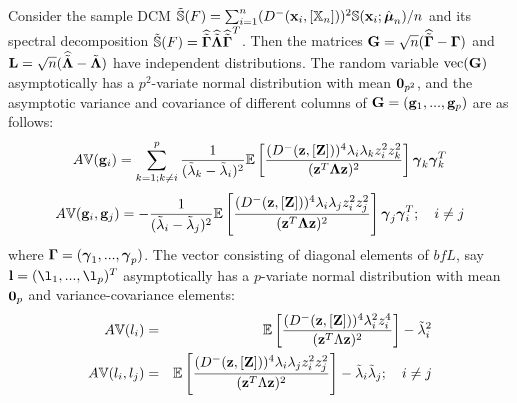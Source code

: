 \begin{Corollary} \label{Corollary:eigendist}
Consider the sample DCM $ {\tilde {{\mathbb{S}}}}(F) = \sum_{i=1}^n ( D^- ({\bf{x}}_i, [ {\mathbb{X}}_n ] ))^2 {\mathbb{S}}( {\bf{x}}_i; \hat{{\boldsymbol{\mu}}}_n )/n $ and its spectral decomposition ${\tilde {{\mathbb{S}}}}(F)= \widehat {\tilde {{\boldsymbol{\Gamma}}}} \widehat {\tilde {{\boldsymbol{\Lambda}}}} \widehat {\tilde {{\boldsymbol{\Gamma}}}}^T $. Then the matrices ${\mathbf{G}} = \sqrt n (\widehat {\tilde {{\boldsymbol{\Gamma}}}} - {\boldsymbol{\Gamma}}) $ and ${\mathbf{L}} = \sqrt n (\widehat {\tilde {{\boldsymbol{\Lambda}}}} - \tilde {{\boldsymbol{\Lambda}}}) $ have independent distributions. The random variable $\operatorname*{vec} ({\mathbf{G}})$ asymptotically has a $p^2$-variate normal distribution with mean ${\bf 0}_{p^2}$, and the asymptotic variance and covariance of different columns of ${\mathbf{G}} = ({\bf{g}}_1,...,{\bf{g}}_p)$ are as follows:
%
\begin{equation} \label{equation:DevEq}
A{\mathbb{V}}({\bf{g}}_i) = \sum_{k=1; k \neq i}^p \frac{1}{(\tilde \lambda_k - \tilde \lambda_i)^2} {\mathbb{E}} \left[ \frac{(D^- ({\bf{z}}, [{\mathbf{Z}}]))^4 \lambda_i \lambda_k z_i^2 z_k^2}{({\bf{z}}^T {\boldsymbol{\Lambda}} {\bf{z}})^2} \right] {\boldsymbol{\gamma}}_k {\boldsymbol{\gamma}}_k^T
\end{equation}
%
\begin{equation}
A{\mathbb{V}}({\bf{g}}_i, {\bf{g}}_j) = - \frac{1}{(\tilde \lambda_i - \tilde \lambda_j)^2} {\mathbb{E}} \left[ \frac{(D^- ({\bf{z}}, [{\mathbf{Z}}]))^4 \lambda_i \lambda_j z_i^2 z_j^2}{({\bf{z}}^T {\boldsymbol{\Lambda}} {\bf{z}})^2} \right] {\boldsymbol{\gamma}}_j {\boldsymbol{\gamma}}_i^T; \quad i \neq j
\end{equation}
%
where ${\boldsymbol{\Gamma}} = ({\boldsymbol{\gamma}}_1,...,{\boldsymbol{\gamma}}_p)$. The vector consisting of diagonal elements of $bfL$, say $\bfl = (\l_1,...,\l_p)^T$ asymptotically has a $p$-variate normal distribution with mean ${\bf 0}_p$ and variance-covariance elements:
%
\begin{eqnarray}
A{\mathbb{V}}(l_i) &=& {\mathbb{E}} \left[ \frac{(D^- ({\bf{z}}, [{\mathbf{Z}}]))^4 \lambda_i^2 z_i^4}{({\bf{z}}^T \Lambda {\bf{z}})^2} \right] - \tilde \lambda_i^2\\
A{\mathbb{V}}(l_i, l_j) &=& {\mathbb{E}} \left[ \frac{(D^- ({\bf{z}}, [{\mathbf{Z}}]))^4 \lambda_i \lambda_j z_i^2 z_j^2}{({\bf{z}}^T \Lambda {\bf{z}})^2} \right] - \tilde \lambda_i \tilde \lambda_j; \quad i \neq j
\end{eqnarray}
%
\end{Corollary}



